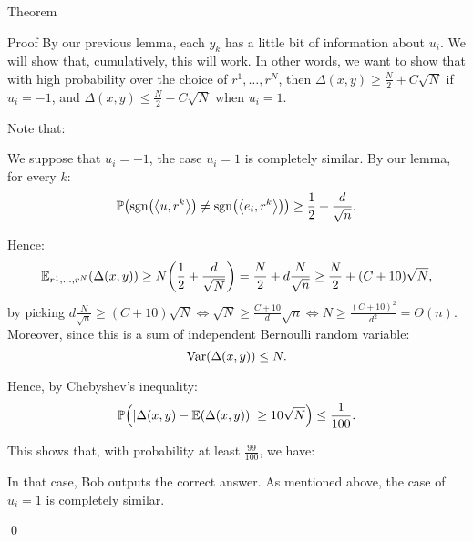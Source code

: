 \documentclass[a4paper]{article}
\begin{document}
\begin{parag}{Theorem}
\begin{subparag}{Proof}
        By our previous lemma, each $y_k$ has a little bit of information about $u_i$. We will show that, cumulatively, this will work. In other words, we want to show that with high probability over the choice of $r^1, \ldots, r^N$, then $\Delta\left(x, y\right) \geq \frac{N}{2} + C \sqrt{N}$ if $u_i = -1$, and $\Delta\left(x, y\right) \leq \frac{N}{2} - C\sqrt{N}$ when $u_i = 1$. 

        Note that: 

        We suppose that $u_i = -1$, the case $u_i = 1$ is completely similar. By our lemma, for every $k$: 
        \[\prob\left(\sgn\left(\left\langle u, r^k \right\rangle\right) \neq \sgn\left(\left\langle e_i, r^k \right\rangle\right)\right) \geq \frac{1}{2} + \frac{d}{\sqrt{n}}.\]
        
        Hence: 
        \[\exval_{r^1, \ldots, r^N}\left(\Delta\left(x, y\right)\right) \geq N\left(\frac{1}{2} + \frac{d}{\sqrt{N}}\right) = \frac{N}{2} + d \frac{N}{\sqrt{n}} \geq \frac{N}{2} + \left(C + 10\right)\sqrt{N},\]
        by picking $d \frac{N}{\sqrt{n}} \geq \left(C+10\right) \sqrt{N} \iff \sqrt{N} \geq \frac{C + 10}{d} \sqrt{n} \iff N \geq \frac{\left(C + 10\right)^2}{d^2} = \Theta\left(n\right)$. Moreover, since this is a sum of independent Bernoulli random variable: 
        \[\Var\left(\Delta\left(x, y\right)\right) \leq N.\]
        
        Hence, by Chebyshev's inequality: 
        \[\prob\left(\left|\Delta\left(x, y\right) - \exval\left(\Delta\left(x, y\right)\right)\right| \geq 10 \sqrt{N}\right) \leq \frac{1}{100}.\]

        This shows that, with probability at least $\frac{99}{100}$, we have:

        In that case, Bob outputs the correct answer. As mentioned above, the case of $u_i = 1$ is completely similar.

        \qed
    \end{subparag}
\end{parag}
\end{document}
